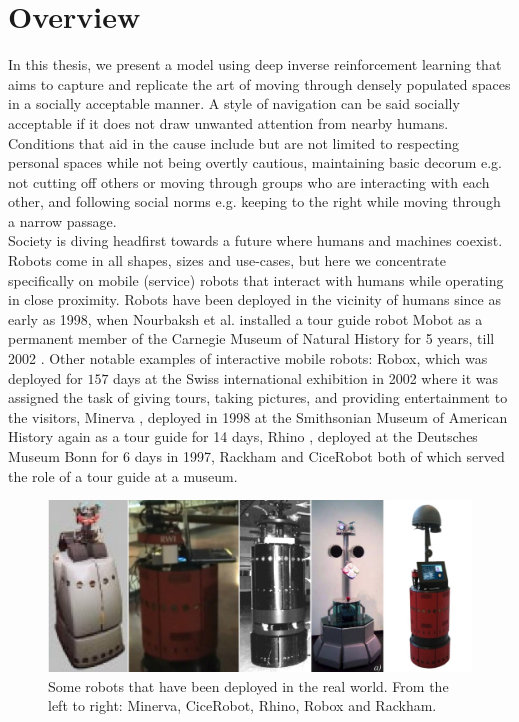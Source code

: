 \label{ch:introduction}
\section{Overview}
In this thesis, we present a model using deep inverse reinforcement learning that aims to capture and replicate the art of moving through densely populated spaces in a socially acceptable manner. A style of navigation can be said socially acceptable if it does not draw unwanted attention from nearby humans. Conditions that aid in the cause include but are not limited to respecting personal spaces while not being overtly cautious, maintaining basic decorum e.g. not cutting off others or moving through groups who are interacting with each other, and following social norms e.g. keeping to the right while moving through a narrow passage.\\
Society is diving headfirst towards a future where humans and machines coexist. Robots come in all shapes, sizes and use-cases, but here we concentrate specifically on mobile (service) robots that interact with humans while operating in close proximity. Robots have been deployed in the vicinity of humans since as early as 1998, when Nourbaksh et al. installed a tour guide robot Mobot as a permanent member of the Carnegie Museum of Natural History for 5 years, till 2002 \cite{Nourbaksh2003Movot}. Other notable examples of interactive mobile robots: Robox, \cite{siciliano_robox_2003} which was deployed for $157$ days at the Swiss international exhibition in 2002 where it was assigned the task of giving tours, taking pictures, and providing entertainment to the visitors, Minerva \cite{minerva_thrun_2000}, deployed in 1998 at the Smithsonian Museum of American History again as a tour guide for 14 days, Rhino \cite{fox_dynamic_1997}, deployed at the Deutsches Museum Bonn for 6 days in 1997, Rackham \cite{rackham_clodic_2006} and CiceRobot \cite{chella_perception_2009} both of which served the role of a tour guide at a museum.\\

\begin{figure}
	\label{fig:real-world-robots}
	\centering
	\includegraphics[width=\linewidth]{figures/minerva_cice_rhino_robox_rackham.jpg}
	\caption{Some robots that have been deployed in the real world. From the left to right: Minerva, CiceRobot, Rhino, Robox and Rackham.}
\end{figure}

